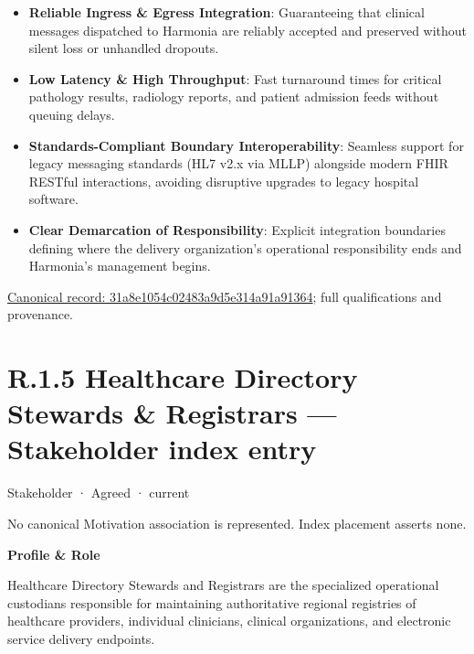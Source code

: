 \begin{itemize}


\item \textbf{Reliable Ingress \& Egress Integration}: Guaranteeing that clinical messages dispatched to Harmonia are reliably accepted and preserved without silent loss or unhandled dropouts.

\item \textbf{Low Latency \& High Throughput}: Fast turnaround times for critical pathology results, radiology reports, and patient admission feeds without queuing delays.

\item \textbf{Standards-Compliant Boundary Interoperability}: Seamless support for legacy messaging standards (HL7 v2.x via MLLP) alongside modern FHIR RESTful interactions, avoiding disruptive upgrades to legacy hospital software.

\item \textbf{Clear Demarcation of Responsibility}: Explicit integration boundaries defining where the delivery organization's operational responsibility ends and Harmonia's management begins.

\end{itemize}

{\footnotesize \href{../../../../continuum/motivation/stakeholder/31a8e1054c02483a9d5e314a91a91364.md}{Canonical record: 31a8e1054c02483a9d5e314a91a91364}; full qualifications and provenance.}\par
\section*{R.1.5 Healthcare Directory Stewards \& Registrars — Stakeholder index entry}
\label{navigation:R.1.5}

\label{element:1c8e2c898a28436693cf2ae69776e125}
{\small Stakeholder · Agreed · current}\par
No canonical Motivation association is represented. Index placement asserts none.\par

\par\medskip\textbf{Profile \& Role}\par


Healthcare Directory Stewards and Registrars are the specialized operational custodians responsible for maintaining authoritative regional registries of healthcare providers, individual clinicians, clinical organizations, and electronic service delivery endpoints.



